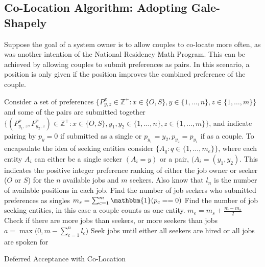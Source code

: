 \subsection{Co-Location Algorithm: Adopting Gale-Shapely}

Suppose the goal of a system owner is to allow couples to co-locate more often, as was another intention of the National Residency Math Program. This can be achieved by allowing couples to submit preferences as pairs. In this scenario, a position is only given if the position improves the combined preference of the couple.

\begin{algorithm}[H]
\SetAlgoLined
{} 
 Consider a set of preferences $\{P^{x}_{y,z} \in \mathbb{Z}^+: x \in \{O,S\}, y \in \{1, \dots, n\}, z \in \{1, \dots, m\}\}$ and some of the pairs are submitted together $\{(P^{x}_{y_1,z}, P^{x}_{y_2,z}) \in \mathbb{Z}^+: x \in \{O,S\}, y_1,y_2 \in \{1, \dots, n\}, z \in \{1, \dots, m\}\}$, and indicate pairing by $p_y = 0$ if submitted as a single or $p_{y_1}=y_2, p_{y_2}=p_{y_1}$ if as a couple. To encapsulate the idea of seeking entities consider $\{A_q : q \in \{1, \dots, m_e\}\}$, where each entity $A_i$ can either be a single seeker $(A_i = y)$ or a pair, $(A_i = (y_1, y_2)$. This indicates the positive integer preference ranking of either the job owner or seeker ($O$ or $S$) for the $n$ available jobs and $m$ seekers. Also know that $l_n$ is the number of available positions in each job.\;
 Find the number of job seekers who submitted preferences as singles \;
 $m_s =  \sum_{c=1}^m \mathbbm{1}(p_c == 0)$ \;
 Find the number of job seeking entities, in this case a couple counts as one entity. \;
 $m_e = m_s + \frac{m - m_s}{2} $ \;
 Check if there are more jobs than seekers, or more seekers than jobs \;
 $a = \max \big(0, m - \sum_{c = 1}^n l_c \big)$\;
 Seek jobs until either all seekers are hired or all jobs are spoken for \;
 \caption{Deferred Acceptance with Co-Location}
\end{algorithm}

